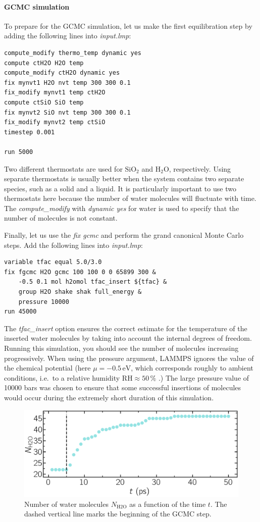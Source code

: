 \documentclass[9pt,tutorial]{livecoms}
\begin{document}
\paragraph{GCMC simulation}
To prepare for the GCMC simulation, let us make the first equilibration step by
adding the following lines into \textit{input.lmp}:
{\normalsize \begin{verbatim}
compute_modify thermo_temp dynamic yes
compute ctH2O H2O temp
compute_modify ctH2O dynamic yes
fix mynvt1 H2O nvt temp 300 300 0.1
fix_modify mynvt1 temp ctH2O
compute ctSiO SiO temp
fix mynvt2 SiO nvt temp 300 300 0.1
fix_modify mynvt2 temp ctSiO
timestep 0.001

run 5000
\end{verbatim}}
Two different thermostats are used for $\text{SiO}_2$ and $\text{H}_2\text{O}$,
respectively. Using separate thermostats is usually better when the system contains
two separate species, such as a solid and a liquid. It is particularly important
to use two thermostats here because the number of water molecules will fluctuate
with time. The \textit{compute\_modify} with \textit{dynamic yes} for water is
used to specify that the number of molecules is not constant.

Finally, let us use the \textit{fix gcmc} and perform the grand canonical Monte
Carlo steps. Add the following lines into \textit{input.lmp}:
{\normalsize \begin{verbatim}
variable tfac equal 5.0/3.0
fix fgcmc H2O gcmc 100 100 0 0 65899 300 &
    -0.5 0.1 mol h2omol tfac_insert ${tfac} &
    group H2O shake shak full_energy &
    pressure 10000
run 45000
\end{verbatim}}
The \textit{tfac\_insert} option ensures the correct estimate for the temperature
of the inserted water molecules by taking into account the internal degrees of
freedom. Running this simulation, you should see the number of molecules increasing
progressively. When using the pressure argument, LAMMPS ignores the value of the
chemical potential (here $\mu = -0.5\,\text{eV}$, which corresponds roughly to
ambient conditions, i.e.~to a relative humidity $\text{RH} \approx 50\,\%$ \cite{gravelle2020multi}.)
The large pressure value of 10000 bars was chosen to ensure that some successful
insertions of molecules would occur during the extremely short duration of this simulation.

\begin{figure}
\centering
\includegraphics[width=\linewidth]{GCMC-number}
\caption{Number of water molecules $N_\text{H2O}$ as a function of the time $t$.
The dashed vertical line marks the beginning of the GCMC step.}
\label{fig:GCMC-number}
\end{figure}
\end{document}
